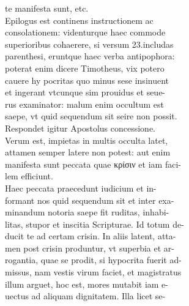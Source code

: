 \documentclass{article}
\begin{document}
\begin{pages}
                te manifesta sunt, etc. \\
                Epilogus est continens instructionem ac \\
                consolationem: videnturque haec commode \\
                superioribus cohaerere, si versum 23.includas \\
                parenthesi, eruntque haec verba antipophora: \\
                poterat enim dicere Timotheus, vix potero \\
                cauere hy pocritas quo minus sese insinuent \\
                et ingerant vtcunque sim prouidus et seue- \\
                rus examinator: malum enim occultum est \\
                saepe, vt quid sequendum sit seire non possit. \\
                Respondet igitur Apostolus concessione. \\
                Verum est, impietas in multis occulta latet, \\
                attamen semper latere non potest: aut enim \\
                manifesta sunt peccata quae κρίσιν et iam faci- \\
                lem efficiunt. \\
                Haec peccata praecedunt iudicium et in- \\
                formant nos quid sequendum sit et inter exa- \\
                minandum notoria saepe fit ruditas, inhabi- \\
                litas, stupor et inscitia Scripturae. Id totum de- \\
                ducit te ad certam crisin. In aliis latent, atta- \\
                men post crisin produntur, vt superbia et ar- \\
                rogantia, quae se prodit, si hypocrita fuerit ad- \\
                missus, nam vestis virum faciet, et magistratus \\
                illum arguet, hoc est, mores mutabit iam e- \\
                uectus ad aliquam dignitatem. Illa licet se- \\

\end{pages}
\end{document}
